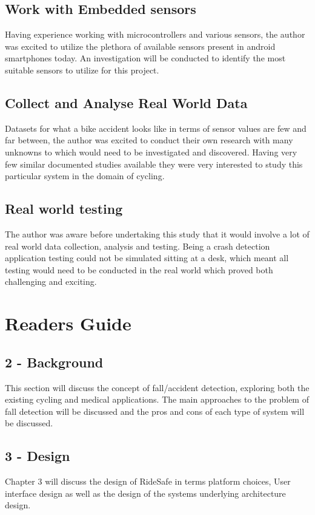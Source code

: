 \subsection*{Work with Embedded sensors}
Having experience working with microcontrollers and various sensors, the author was excited to utilize the plethora of available sensors present in android smartphones today. An investigation will be conducted to identify the most suitable sensors to utilize for this project.



\subsection*{Collect and Analyse Real World Data}
Datasets for what a bike accident looks like in terms of sensor values are few and far between, the author was excited to conduct their own research with many unknowns to which would need to be investigated and discovered. Having very few similar documented studies available they were very interested to study this particular system in the domain of cycling.  


\subsection*{Real world testing}
The author was aware before undertaking this study that it would involve a lot of real world data collection, analysis and testing. Being a crash detection application testing could not be simulated sitting at a desk, which meant all testing would need to be conducted in the real world which proved both challenging and exciting.

\newpage

\section{Readers Guide}

\subsection* {2 - Background}
This section will discuss the concept of fall/accident detection, exploring both the existing cycling and medical applications. The main approaches to the problem of fall detection will be discussed and the pros and cons of each type of system will be discussed.


\subsection* {3 - Design}
Chapter 3 will discuss the design of RideSafe in terms platform choices,  User interface design as well as the design of the systems underlying architecture design.


